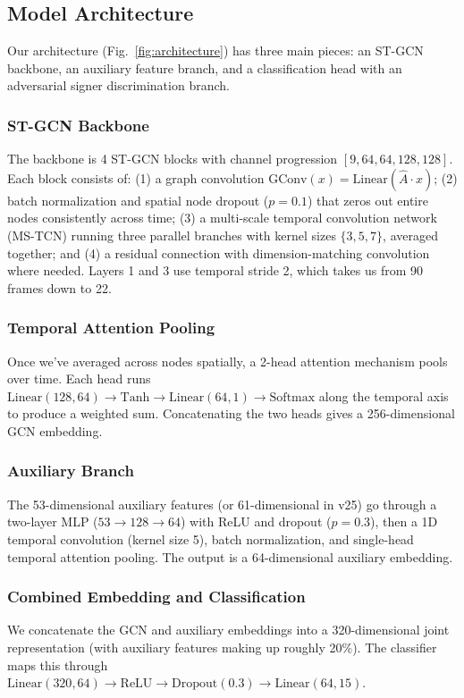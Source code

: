 \documentclass[conference]{IEEEtran}
\begin{document}
\subsection{Model Architecture}

Our architecture (Fig.~\ref{fig:architecture}) has three main pieces: an ST-GCN backbone, an auxiliary feature branch, and a classification head with an adversarial signer discrimination branch.

\subsubsection{ST-GCN Backbone}
The backbone is 4 ST-GCN blocks with channel progression $[9, 64, 64, 128, 128]$. Each block consists of: (1) a graph convolution $\text{GConv}(x) = \text{Linear}(\hat{A} \cdot x)$; (2) batch normalization and spatial node dropout ($p = 0.1$) that zeros out entire nodes consistently across time; (3) a multi-scale temporal convolution network (MS-TCN) running three parallel branches with kernel sizes $\{3, 5, 7\}$, averaged together; and (4) a residual connection with dimension-matching convolution where needed. Layers 1 and 3 use temporal stride 2, which takes us from 90 frames down to 22.

\subsubsection{Temporal Attention Pooling}
Once we've averaged across nodes spatially, a 2-head attention mechanism pools over time. Each head runs $\text{Linear}(128, 64) \rightarrow \text{Tanh} \rightarrow \text{Linear}(64, 1) \rightarrow \text{Softmax}$ along the temporal axis to produce a weighted sum. Concatenating the two heads gives a 256-dimensional GCN embedding.

\subsubsection{Auxiliary Branch}
The 53-dimensional auxiliary features (or 61-dimensional in v25) go through a two-layer MLP ($53 \rightarrow 128 \rightarrow 64$) with ReLU and dropout ($p = 0.3$), then a 1D temporal convolution (kernel size 5), batch normalization, and single-head temporal attention pooling. The output is a 64-dimensional auxiliary embedding.

\subsubsection{Combined Embedding and Classification}
We concatenate the GCN and auxiliary embeddings into a 320-dimensional joint representation (with auxiliary features making up roughly 20\%). The classifier maps this through $\text{Linear}(320, 64) \rightarrow \text{ReLU} \rightarrow \text{Dropout}(0.3) \rightarrow \text{Linear}(64, 15)$.
\end{document}
